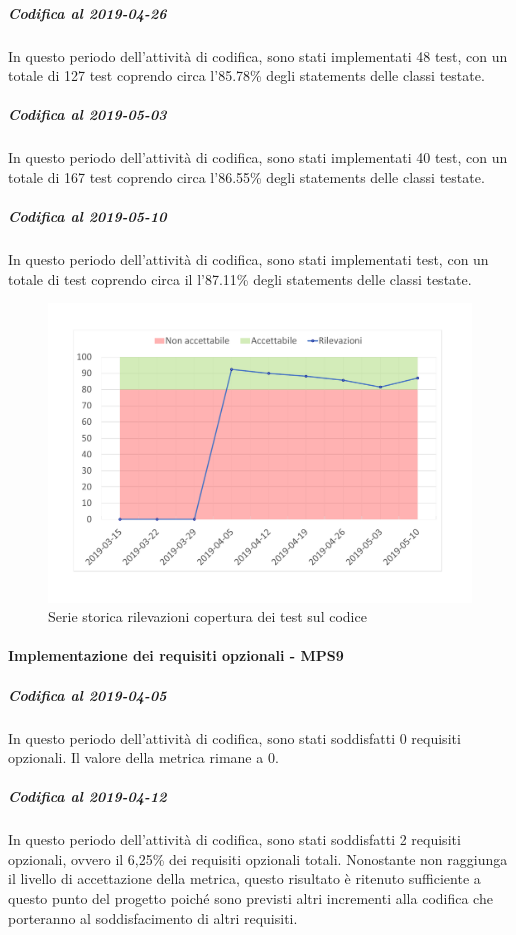 \subparagraph{Codifica al 2019-04-26}
In questo periodo dell'attività di codifica, sono stati implementati 48 test, con un totale di 127 test coprendo circa l'85.78\% degli statements delle classi testate.

\subparagraph{Codifica al 2019-05-03}
In questo periodo dell'attività di codifica, sono stati implementati 40 test, con un totale di 167 test coprendo circa l'86.55\% degli statements delle classi testate.

\subparagraph{Codifica al 2019-05-10}
In questo periodo dell'attività di codifica, sono stati implementati  test, con un totale di  test coprendo circa il l'87.11\% degli statements delle classi testate.

\begin{figure}[H]
	\centering
	\includegraphics[scale=0.6]{images/resoconto/MPS8Chart.pdf}
	\caption{Serie storica rilevazioni copertura dei test sul codice}	
\end{figure}


\paragraph{Implementazione dei requisiti opzionali - MPS9}
\subparagraph{Codifica al 2019-04-05}
In questo periodo dell'attività di codifica, sono stati soddisfatti 0 requisiti opzionali. Il valore della metrica rimane a 0.

\subparagraph{Codifica al 2019-04-12}
In questo periodo dell'attività di codifica, sono stati soddisfatti 2 requisiti opzionali, ovvero il 6,25\% dei requisiti opzionali totali.
Nonostante non raggiunga il livello di accettazione della
metrica, questo risultato è ritenuto sufficiente a questo punto del progetto poiché sono previsti altri incrementi alla codifica che porteranno al soddisfacimento di altri requisiti.

